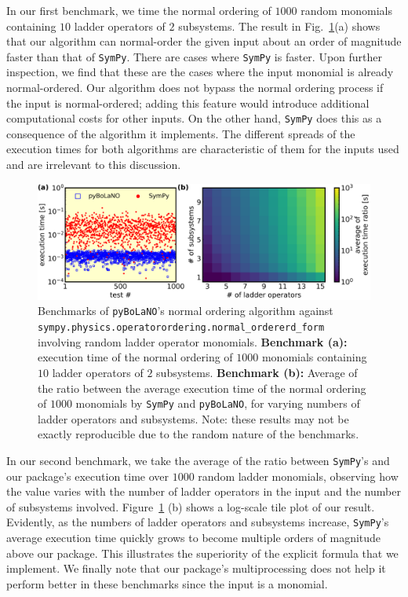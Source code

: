 \documentclass[5p, twocolumn, 10pt, sort&compress]{elsarticle}
\newenvironment{revision}{}{}
\begin{document}
\begin{revision}
In our first benchmark, we time the normal ordering of $1000$ random monomials containing $10$ ladder operators of $2$ subsystems. The result in Fig.~\ref{fig_2}(a) shows that our algorithm can normal-order the given input about an order of magnitude faster than that of \texttt{SymPy}. There are cases where \texttt{SymPy} is faster.  Upon further inspection, we find that these are the cases where the input monomial is already normal-ordered. Our algorithm does not bypass the normal ordering process if the input is normal-ordered; adding this feature would introduce additional computational costs for other inputs. On the other hand, \texttt{SymPy} does this as a consequence of the algorithm it implements. The different spreads of the execution times for both algorithms are characteristic of them for the inputs used and are irrelevant to this discussion. 

\begin{figure}[!t]
    \centering
    \includegraphics[width=0.98\linewidth]{fig_2.png}
    \caption{\begin{revision}Benchmarks of \texttt{pyBoLaNO}'s normal ordering algorithm against \texttt{sympy.physics.operatorordering.normal\_ordererd\_form} involving random ladder operator monomials. \textbf{Benchmark (a):} execution time of the normal ordering of $1000$ monomials containing $10$ ladder operators of $2$ subsystems. \textbf{Benchmark (b):} Average of the ratio between the average execution time of the normal ordering of $1000$ monomials by \texttt{SymPy} and \texttt{pyBoLaNO}, for varying numbers of ladder operators and subsystems. Note: these results may not be exactly reproducible due to the random nature of the benchmarks.\end{revision}}
    \label{fig_2}
\end{figure}

In our second benchmark, we take the average of the ratio between \texttt{SymPy}'s and our package's execution time over $1000$ random ladder monomials, observing how the value varies with the number of ladder operators in the input and the number of subsystems involved. Figure~\ref{fig_2} (b) shows a log-scale tile plot of our result. Evidently, as the numbers of ladder operators and subsystems increase, \texttt{SymPy}'s average execution time quickly grows to become multiple orders of magnitude above our package. This illustrates the superiority of the explicit formula that we implement.  We finally note that our package's multiprocessing does not help it perform better in these benchmarks since the input is a monomial. 

\end{revision}
\end{document}
